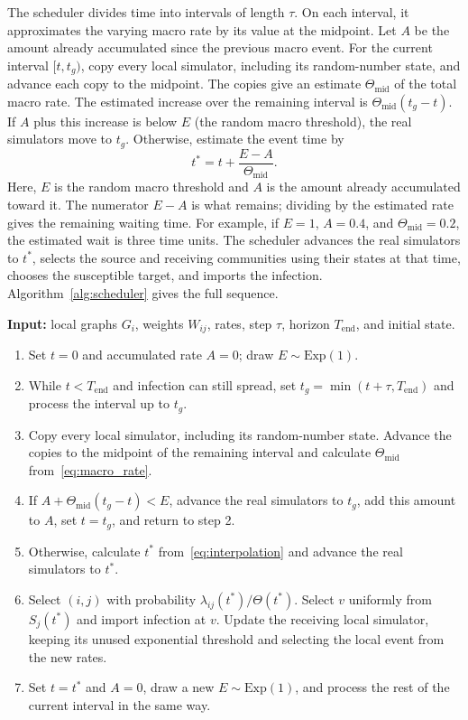 \documentclass[a4paper,fleqn]{cas-sc}
\newcommand{\Exp}{\mathrm{Exp}}
\begin{document}
The scheduler divides time into intervals of length $\tau$. On each interval, it approximates the varying macro rate by its value at the midpoint. Let $A$ be the amount already accumulated since the previous macro event. For the current interval $[t,t_g)$, copy every local simulator, including its random-number state, and advance each copy to the midpoint. The copies give an estimate $\Theta_{\mathrm{mid}}$ of the total macro rate. The estimated increase over the remaining interval is $\Theta_{\mathrm{mid}}(t_g-t)$. If $A$ plus this increase is below $E$ (the random macro threshold), the real simulators move to $t_g$. Otherwise, estimate the event time by
\begin{equation}
\label{eq:interpolation}
t^\ast=t+\frac{E-A}{\Theta_{\mathrm{mid}}}.
\end{equation}
Here, $E$ is the random macro threshold and $A$ is the amount already accumulated toward it. The numerator $E-A$ is what remains; dividing by the estimated rate gives the remaining waiting time. For example, if $E=1$, $A=0.4$, and $\Theta_{\mathrm{mid}}=0.2$, the estimated wait is three time units. The scheduler advances the real simulators to $t^\ast$, selects the source and receiving communities using their states at that time, chooses the susceptible target, and imports the infection. Algorithm~\ref{alg:scheduler} gives the full sequence.

\begin{algorithm}[tbp]
\color{black}
\caption{\textcolor{black}{Grid-synchronised two-scale simulation of one realisation.}}
\label{alg:scheduler}
\small

\textbf{Input:} local graphs $G_i$, weights $W_{ij}$, rates, step $\tau$, horizon $T_{\mathrm{end}}$, and initial state.
\begin{enumerate}
\item Set $t=0$ and accumulated rate $A=0$; draw $E\sim\Exp(1)$.
\item While $t<T_{\mathrm{end}}$ and infection can still spread, set $t_g=\min(t+\tau,T_{\mathrm{end}})$ and process the interval up to $t_g$.
\item Copy every local simulator, including its random-number state. Advance the copies to the midpoint of the remaining interval and calculate $\Theta_{\mathrm{mid}}$ from~\eqref{eq:macro_rate}.
\item If $A+\Theta_{\mathrm{mid}}(t_g-t)<E$, advance the real simulators to $t_g$, add this amount to $A$, set $t=t_g$, and return to step 2.
\item Otherwise, calculate $t^\ast$ from~\eqref{eq:interpolation} and advance the real simulators to $t^\ast$.
\item Select $(i,j)$ with probability $\lambda_{ij}(t^\ast)/\Theta(t^\ast)$. Select $v$ uniformly from $S_j(t^\ast)$ and import infection at $v$. Update the receiving local simulator, keeping its unused exponential threshold and selecting the local event from the new rates.
\item Set $t=t^\ast$ and $A=0$, draw a new $E\sim\Exp(1)$, and process the rest of the current interval in the same way.
\end{enumerate}

\end{algorithm}
\end{document}
